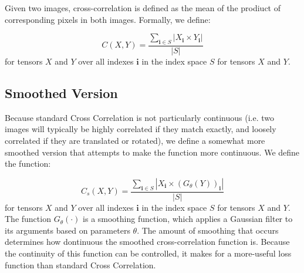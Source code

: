 Given two images, cross-correlation is defined as the mean of the prodiuct of corresponding pixels in both images. Formally, we define:

$$C(X, Y) = \frac{\sum_{\bm{i} \in S}{|X_{\bm{i}} \times Y_{\bm{i}}|}}{|S|}$$
for tensors $X$ and $Y$ over all indexes $\bm{i}$ in the index space $S$ for tensors $X$ and $Y$.

\subsection{Smoothed Version}

Because standard Cross Correlation is not particularly continuous (i.e. two images will typically be highly correlated if they match exactly, and loosely correlated if they are translated or rotated), we define a somewhat more smoothed version that attempts to make the function more continuous. We define the function:

$$C_s(X, Y) = \frac{\sum_{\bm{i} \in S}{|X_{\bm{i}} \times (G_{\theta}(Y))_{\bm{i}}|}}{|S|}$$
for tensors $X$ and $Y$ over all indexes $\bm{i}$ in the index space $S$ for tensors $X$ and $Y$. The function $G_{\theta}(\cdot)$ is a smoothing function, which applies a Gaussian filter to its arguments based on parameters $\theta$. The amount of smoothing that occurs determines how dontinuous the smoothed cross-correlation function is. Because the continuity of this function can be controlled, it makes for a more-useful loss function than standard Cross Correlation.